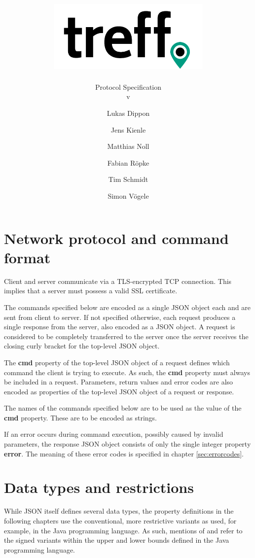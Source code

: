 \documentclass[parskip=full,11pt]{scrartcl}
\title{\includegraphics[width = 80mm]{images/logo_crop.png}}
\subtitle{\huge Protocol Specification\\
          v\protocolversion}
\author{Lukas Dippon
        \and Jens Kienle
        \and Matthias Noll
        \and Fabian Röpke
        \and Tim Schmidt
        \and Simon Vögele}
\begin{document}
\maketitle
\thispagestyle{empty} %

\pagebreak
\tableofcontents

\pagebreak
\section{Network protocol and command format}
Client and server communicate via a TLS-encrypted TCP connection.
This implies that a server must possess a valid SSL certificate.

The commands specified below are encoded as a single JSON object each and are
sent from client to server.
If not specified otherwise, each request produces a single response from the
server, also encoded as a JSON object.
A request is considered to be completely transferred to the server once the
server receives the closing curly bracket for the top-level JSON object.

The \textbf{cmd} property of the top-level JSON object of a request defines
which command the client is trying to execute.
As such, the \textbf{cmd} property must always be included in a request.
Parameters, return values and error codes are also encoded as properties of
the top-level JSON object of a request or response.

The names of the commands specified below are to be used as the value of the
\textbf{cmd} property.
These are to be encoded as strings.

If an error occurs during command execution, possibly caused by invalid
parameters, the response JSON object consists of only the single integer
property \textbf{error}.
The meaning of these error codes is specified in chapter \ref{sec:errorcodes}.

\section{Data types and restrictions}
While JSON itself defines several data types, the property
definitions in the following chapters use the conventional, more restrictive
variants as used, for example, in the Java programming language.
As such, mentions of  and  refer to the signed variants
within the upper and lower bounds defined in the Java programming language.
\end{document}
